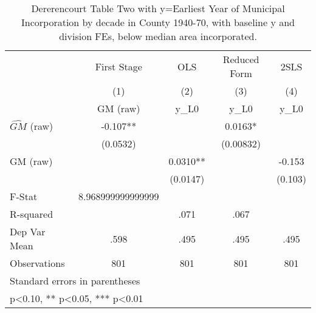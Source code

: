\begin{table}[htbp]\centering
\def\sym#1{\ifmmode^{#1}\else\(^{#1}\)\fi}
\caption{Dererencourt Table Two with y=Earliest Year of Municipal Incorporation by decade in County 1940-70, with baseline y and division FEs, below median area incorporated.}
\begin{tabular}{l*{4}{c}}
\toprule
                    & First Stage   &         OLS   &Reduced Form   &        2SLS   \\
                    &\multicolumn{1}{c}{(1)}&\multicolumn{1}{c}{(2)}&\multicolumn{1}{c}{(3)}&\multicolumn{1}{c}{(4)}\\
                    &\multicolumn{1}{c}{GM  (raw)}&\multicolumn{1}{c}{y\_L0}&\multicolumn{1}{c}{y\_L0}&\multicolumn{1}{c}{y\_L0}\\
\midrule
$\hat{GM}$ (raw)    &      -0.107** &               &      0.0163*  &               \\
                    &    (0.0532)   &               &   (0.00832)   &               \\
\addlinespace
GM  (raw)           &               &      0.0310** &               &      -0.153   \\
                    &               &    (0.0147)   &               &     (0.103)   \\
\midrule
F-Stat              &8.968999999999999   &               &               &               \\
R-squared           &               &        .071   &        .067   &               \\
Dep Var Mean        &        .598   &        .495   &        .495   &        .495   \\
Observations        &         801   &         801   &         801   &         801   \\
\bottomrule
\multicolumn{5}{l}{\footnotesize Standard errors in parentheses}\\
\multicolumn{5}{l}{\footnotesize * p<0.10, ** p<0.05, *** p<0.01}\\
\end{tabular}
\end{table}
